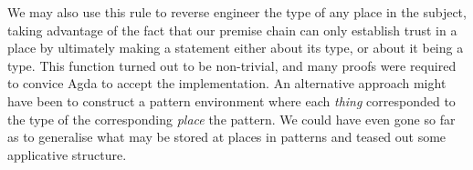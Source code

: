 We may also use this rule to reverse engineer
the type of any place in the subject, taking advantage of the fact that
our premise chain can only establish trust in a place by ultimately making
a statement either about its type, or about it being a type. This function
turned out to be non-trivial, and many proofs were required to convice
Agda to accept the implementation. An alternative approach might have been to
construct a pattern environment where each \emph{thing} corresponded to the
type of the corresponding \emph{place} the pattern. We could have even gone
so far as to generalise what may be stored at places in patterns and
teased out some applicative structure.
\begin{code}%
\>[0]\AgdaSpace{}%
\AgdaSymbol{:}%
\>[1407I]\AgdaSymbol{(}\AgdaSpace{}%
\AgdaSymbol{:}\AgdaSpace{}%
\AgdaSymbol{)}%
\>[39]\<%
\\
\>[.][@{}l@{}]\<[1407I]%
\>[9]\AgdaSymbol{(}\AgdaSpace{}%
\AgdaSymbol{:}\AgdaSpace{}%
\AgdaSpace{}%
\AgdaSymbol{(}\AgdaSpace{}%
\AgdaSpace{}%
\AgdaSpace{}%
\AgdaSymbol{)}\AgdaSpace{}%
\AgdaSymbol{)}%
\>[39]\<%
\\
%
\>[9]\AgdaSymbol{(}\AgdaSpace{}%
\AgdaSpace{}%
\AgdaSpace{}%
\AgdaSymbol{)}\AgdaSpace{}%
%
\>[39]\<%
\\
%
\>[9]\AgdaSymbol{((}\AgdaSpace{}%
\AgdaSpace{}%
\AgdaSymbol{(}\AgdaSpace{}%
\AgdaSymbol{))}%
\>[29]\AgdaSymbol{)}%
\>[39]\<%
\\
%
\>[9]\AgdaSpace{}%
\AgdaSymbol{((}\AgdaSpace{}%
\AgdaSymbol{)}\AgdaSpace{}%
\AgdaOperator{\AgdaPrimitive{+}}\AgdaSpace{}%
\AgdaSymbol{)}\<%
\end{code}
